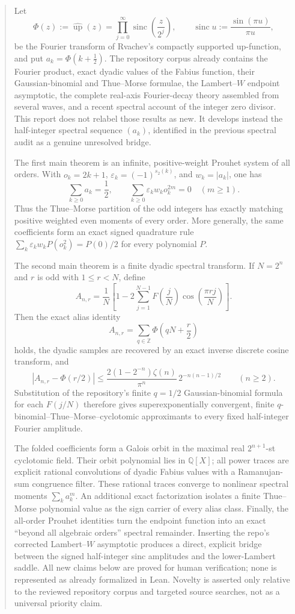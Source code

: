 \documentclass[11pt,oneside]{article}
\theoremstyle{definition}
\theoremstyle{remark}
\newcommand{\Q}{\mathbb Q}
\newcommand{\Z}{\mathbb Z}
\newcommand{\Up}{\operatorname{up}}
\newcommand{\sinc}{\operatorname{sinc}}
\newcommand{\eps}{\varepsilon}
\newcommand{\PhiU}{\Phi}
\begin{document}
\begin{abstract}
Let
\[
 \PhiU(z):=\widehat{\Up}(z)
 =\prod_{j=0}^{\infty}\sinc\!\left(\frac z{2^j}\right),
 \qquad \sinc u:=\frac{\sin(\pi u)}{\pi u},
\]
be the Fourier transform of Rvachev's compactly supported up-function, and put
$a_k=\PhiU(k+\tfrac12)$.  The repository corpus already contains the Fourier
product, exact dyadic values of the Fabius function, their Gaussian-binomial and
Thue--Morse formulae, the Lambert--$W$ endpoint asymptotic, the complete real-axis
Fourier-decay theory assembled from several waves, and a recent spectral account
of the integer zero divisor.  This report does not relabel those results as new.
It develops instead the half-integer spectral sequence $(a_k)$, identified in the
previous spectral audit as a genuine unresolved bridge.

The first main theorem is an infinite, positive-weight Prouhet system of all
orders.  With $o_k=2k+1$, $\eps_k=(-1)^{s_2(k)}$, and
$w_k=|a_k|$, one has
\[
 \sum_{k\ge0}a_k=\frac12,
 \qquad
 \sum_{k\ge0}\eps_k w_k o_k^{2m}=0\quad(m\ge1).
\]
Thus the Thue--Morse partition of the odd integers has exactly matching positive
weighted even moments of every order.  More generally, the same coefficients
form an exact signed quadrature rule
$\sum_k\eps_kw_kP(o_k^2)=P(0)/2$ for every polynomial $P$.

The second main theorem is a finite dyadic spectral transform.  If $N=2^n$ and
$r$ is odd with $1\le r<N$, define
\[
 A_{n,r}=\frac1N\left[1-2\sum_{j=1}^{N-1}
 F\!\left(\frac jN\right)\cos\!\left(\frac{\pi rj}{N}\right)\right].
\]
Then the exact alias identity
\[
 A_{n,r}=\sum_{q\in\Z}\PhiU\!\left(qN+\frac r2\right)
\]
holds, the dyadic samples are recovered by an exact inverse discrete cosine
transform, and
\[
 |A_{n,r}-\PhiU(r/2)|\le
 \frac{2(1-2^{-n})\zeta(n)}{\pi^n}\,2^{-n(n-1)/2}
 \qquad(n\ge2).
\]
Substitution of the repository's finite $q=1/2$ Gaussian-binomial formula for
each $F(j/N)$ therefore gives superexponentially convergent, finite
$q$-binomial--Thue--Morse--cyclotomic approximants to every fixed half-integer
Fourier amplitude.

The folded coefficients form a Galois orbit in the maximal real
$2^{n+1}$-st cyclotomic field.  Their orbit polynomial lies in $\Q[X]$; all power
traces are explicit rational convolutions of dyadic Fabius values with a
Ramanujan-sum congruence filter.  These rational traces converge to nonlinear
spectral moments $\sum_k a_k^m$.  An additional exact factorization isolates a
finite Thue--Morse polynomial value as the sign carrier of every alias class.
Finally, the all-order Prouhet identities turn the endpoint function into an
exact ``beyond all algebraic orders'' spectral remainder.  Inserting the
repo's corrected Lambert--$W$ asymptotic produces a direct, explicit bridge
between the signed half-integer sinc amplitudes and the lower-Lambert saddle.
All new claims below are proved for human verification; none is represented as
already formalized in Lean.  Novelty is asserted only relative to the reviewed
repository corpus and targeted source searches, not as a universal priority
claim.
\end{abstract}
\end{document}
